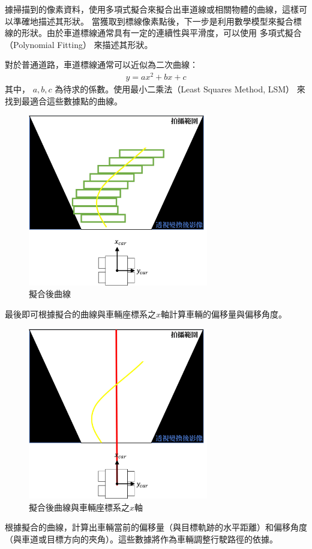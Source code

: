 \documentclass[12pt]{article}       %
\begin{document}
據掃描到的像素資料，使用多項式擬合來擬合出車道線或相關物體的曲線，這樣可以準確地描述其形狀。
當獲取到標線像素點後，下一步是利用數學模型來擬合標線的形狀。由於車道標線通常具有一定的連續性與平滑度，可以使用 多項式擬合（Polynomial Fitting） 來描述其形狀。

\hspace{2em}對於普通道路，車道標線通常可以近似為二次曲線： \begin{align} y = ax^2 + bx + c \end{align} 其中，
$a,b,c$ 為待求的係數。使用最小二乘法（Least Squares Method, LSM） 來找到最適合這些數據點的曲線。
\begin{figure}[H]
    \centering
    \includegraphics[width=0.7\textwidth]{18.jpg}     %
    \caption{擬合後曲線}    %
    \label{fig:18}    %
\end{figure}

最後即可根據擬合的曲線與車輛座標系之$x$軸計算車輛的偏移量與偏移角度。

\begin{figure}[H]
    \centering
    \includegraphics[width=0.7\textwidth]{19.jpg}     %
    \caption{擬合後曲線與車輛座標系之$x$軸}    %
    \label{fig:19}    %
\end{figure}
根據擬合的曲線，計算出車輛當前的偏移量（與目標軌跡的水平距離）和偏移角度（與車道或目標方向的夾角）。這些數據將作為車輛調整行駛路徑的依據。
\end{document}
